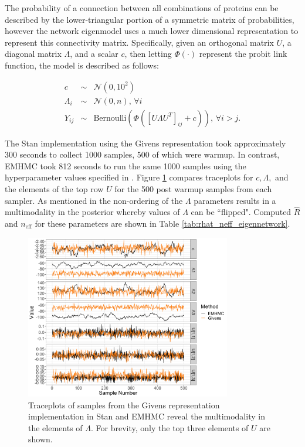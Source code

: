 \documentclass[ba]{imsart}
\numberwithin{equation}{section}
\theoremstyle{plain}
\begin{document}
\noindent The probability of a connection between all combinations of proteins can be described by the lower-triangular portion of a symmetric matrix of probabilities, however the network eigenmodel uses a much lower dimensional representation to represent this connectivity matrix. Specifically, given an orthogonal matrix $U$, a diagonal matrix $\Lambda$, and a scalar $c$, then letting $\Phi(\cdot)$ represent the probit link function, the model is described as follows:

\begin{eqnarray}
c &\sim& \mathcal{N}(0, 10^2)\\
\Lambda_i &\sim& \mathcal{N}(0, n),\, \forall i\\
Y_{ij} &\sim& \mathrm{Bernoulli} \left(\Phi ([U \Lambda U^T]_{ij} + c) \right),\, \forall i > j.
\end{eqnarray}

\noindent The Stan implementation using the Givens representation took approximately 300 seconds to collect 1000 samples, 500 of which were warmup. In contrast, EMHMC took 812 seconds to run the same 1000 samples using the hyperparameter values specified in  \cite{byrne2013geodesic}. Figure \ref{fig:eigennetwork_traceplots} compares traceplots for $c, \Lambda,$ and the elements of the top row $U$ for the 500 post warmup samples from each sampler. As mentioned in \cite{byrne2013geodesic} the non-ordering of the $\Lambda$ parameters results in a multimodality in the posterior whereby values of $\Lambda$ can be ``flipped". Computed $\hat{R}$ and $n_{\mathrm{eff}}$ for these parameters are shown in Table \ref{tab:rhat_neff_eigennetwork}.

\begin{figure}[h]
\centering
\vspace{.1in}
\includegraphics[width=0.8\textwidth]{figures/eigennetwork_traceplots.png}
\vspace{.05in}
\caption{Traceplots of samples from the Givens representation implementation in Stan and EMHMC reveal the multimodality in the elements of $\Lambda$. For brevity, only the top three elements of $U$ are shown.}
\label{fig:eigennetwork_traceplots}
\end{figure}
\end{document}
